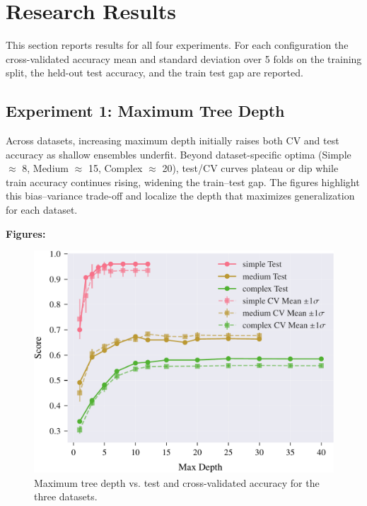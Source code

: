 \documentclass[conference]{IEEEtran}
\begin{document}
\section{Research Results}

\label{sec:results}

This section reports results for all four experiments. For each configuration the cross-validated accuracy mean and standard deviation over 5 folds on 
the training split, the held-out test accuracy, and the train test gap are reported. 


\subsection{Experiment 1: Maximum Tree Depth}
\label{sec:results-exp1}

Across datasets, increasing maximum depth initially raises both CV and test accuracy as shallow ensembles underfit. Beyond dataset-specific optima (Simple $\approx$ 8, Medium $\approx$ 15, Complex $\approx$ 20), test/CV curves plateau or dip while train accuracy continues rising, widening the train--test gap. The figures highlight this bias--variance trade-off and localize the depth that maximizes generalization for each dataset.

\textbf{Figures:}
\begin{figure}[H]
  \centering
  \includegraphics[width=\linewidth]{images/all_datasets_depth_accuracy.pdf}
  \caption{Maximum tree depth vs. test and cross-validated accuracy for the three datasets.}
  \label{fig:exp1-depth-acc}
\end{figure}
\end{document}
